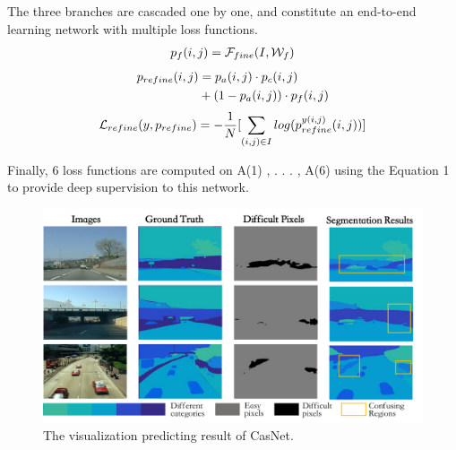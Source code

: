 \documentclass[10.5pt,compsoc]{TsT}
\theoremstyle{mystyle}
\begin{document}
{The three branches are cascaded one by one, and constitute an end-to-end learning network with multiple loss functions.
\begin{equation}\label{equ7}
\setlength\abovedisplayskip{8pt}
\setlength\belowdisplayskip{8pt}
\begin{split}
p_{f}(i,j) = \mathcal{F}_{fine}(I, \mathcal{W}_f)\\
\end{split}
\end{equation}
\begin{equation}\label{equ8}
\setlength\abovedisplayskip{8pt}
\setlength\belowdisplayskip{8pt}
\begin{split}
p_{refine}(i,j) &= p_{a}(i,j) \cdot p_{c}(i,j)\\
&+ (1-p_{a}(i,j)) \cdot p_{f}(i,j)\\
\end{split}
\end{equation}
\begin{equation}\label{equ9}
\setlength\abovedisplayskip{8pt}
\setlength\belowdisplayskip{8pt}
\begin{split}
\mathcal{L}_{refine}(y, p_{refine}) = - \frac{1}{N}[\sum_{(i,j)\in I}log(p^{y(i,j)}_{refine}(i,j))]\\
\end{split}
\end{equation}

Finally, 6 loss functions are
computed on {A(1)
, . . . , A(6)} using the Equation 1 to provide
deep supervision to this network.


\begin{figure}[ht]
\centering
\includegraphics[width=1.9\columnwidth]{fig3.png}
\caption{The visualization predicting result of CasNet.}
\label{fig3}
\end{figure} 

}
\end{document}
